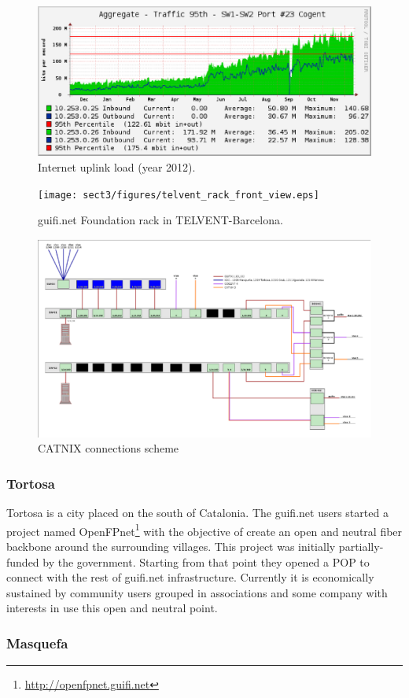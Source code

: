 \begin{figure}[htbp]
  \centering
  \includegraphics[scale=.65]{sect3/figures/cogent_network_load2.eps} 
  \caption{Internet uplink load (year 2012).}
  \label{fig:cogent_load}
\end{figure}


\begin{figure}[htbp]
  \centering
  \texttt{[image: sect3/figures/telvent\_rack\_front\_view.eps]} 
  \caption{guifi.net Foundation rack in TELVENT-Barcelona.}
  \label{fig:telvent_rack}
\end{figure}


\begin{figure}[htbp]
  \centering
  \includegraphics[scale=.75]{sect3/figures/telvent_scheme.eps} 
  \caption{CATNIX connections scheme}
  \label{fig:telvent_scheme}
\end{figure}




\subsubsection{Tortosa}
Tortosa is a city placed on the south of Catalonia. The guifi.net users started a project named 
OpenFPnet\footnote{\url{http://openfpnet.guifi.net}} with the objective of create an open and neutral fiber backbone 
around the surrounding villages. This project was initially partially-funded by the government. 
\newline
Starting from that point they opened a POP to connect with the rest of guifi.net infrastructure. 
Currently it is economically sustained by community users grouped in associations and some company with interests in use
this open and neutral point.



\subsubsection{Masquefa}

